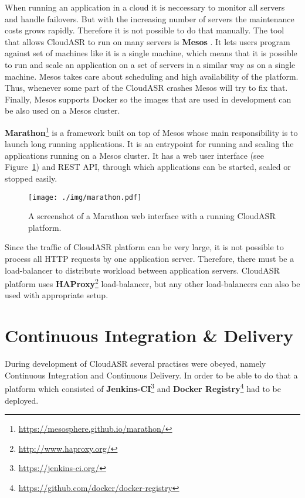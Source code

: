 When running an application in a cloud it is neccessary to monitor all servers and handle failovers.
But with the increasing number of servers the maintenance costs grows rapidly.
Therefore it is not possible to do that manually.
The tool that allows CloudASR to run on many servers is \textbf{Mesos} \cite{hindman2011mesos}.
It lets users program against set of machines like it is a single machine,
  which means that it is possible to run and scale an application on a set of servers in a similar way as on a single machine.
Mesos takes care about scheduling and high availability of the platform.
Thus, whenever some part of the CloudASR crashes Mesos will try to fix that.
Finally, Mesos supports Docker so the images that are used in development can be also used on a Mesos cluster.

\textbf{Marathon}\footnote{\url{https://mesosphere.github.io/marathon/}} is a framework built on top of Mesos whose main responsibility is to launch long running applications.
It is an entrypoint for running and scaling the applications running on a Mesos cluster.
It has a web user interface (see Figure~\ref{fig:marathon}) and REST API,
  through which applications can be started, scaled or stopped easily.

\begin{figure}
  \centering
  \texttt{[image: ./img/marathon.pdf]}

  \caption{
    A screenshot of a Marathon web interface with a running CloudASR platform.
  }
  \label{fig:marathon}
\end{figure}

Since the traffic of CloudASR platform can be very large,
  it is not possible to process all HTTP requests by one application server.
Therefore, there must be a load-balancer to distribute workload between application servers.
CloudASR platform uses \textbf{HAProxy}\footnote{\url{http://www.haproxy.org/}} load-balancer,
  but any other load-balancers can also be used with appropriate setup.



\section{Continuous Integration \& Delivery}
During development of CloudASR several practises were obeyed,
  namely Continuous Integration and Continuous Delivery.
In order to be able to do that a platform which consisted of \textbf{Jenkins-CI}\footnote{\url{https://jenkins-ci.org/}} and \textbf{Docker Registry}\footnote{\url{https://github.com/docker/docker-registry}} had to be deployed.

